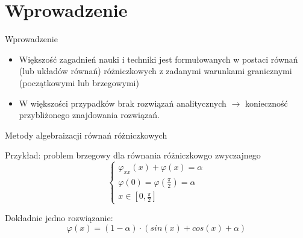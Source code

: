 \section{Wprowadzenie}

	\begin{frame}{Wprowadzenie}
		\begin{itemize}
			\item Większość zagadnień nauki i techniki jest formułowanych w postaci równań (lub układów równań) różniczkowych z zadanymi warunkami granicznymi (początkowymi lub brzegowymi)
					
			\item W większości przypadków brak rozwiązań analitycznych $\rightarrow$ konieczność przybliżonego znajdowania rozwiązań.
		\end{itemize}
	\end{frame}
	
		
	\begin{frame}{Metody algebraizacji równań różniczkowych}

		\begin{exampleblock}{Przykład: problem brzegowy dla równania różniczkowgo zwyczajnego}
			$$
			\begin{cases}
				\varphi_{xx}(x) + \varphi(x) = \alpha \\
				\varphi(0) = \varphi(\frac{\pi}{2}) = \alpha \\
				x \in [0,\frac{\pi}{2}]
			\end{cases}
			$$
			
			Dokładnie jedno rozwiązanie:
			$$
			\varphi(x) = (1- \alpha) \cdot (sin(x) + cos(x) + \alpha)
			$$			
		\end{exampleblock}
	
	\end{frame}
